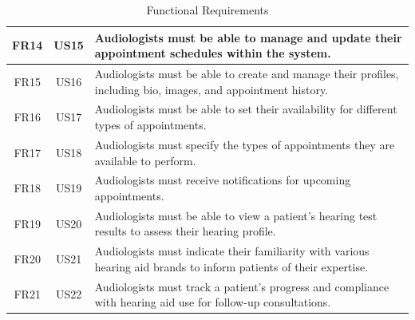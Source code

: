 \documentclass{article}
\begin{document}
\begin{table}[h]
\begin{tabularx}{\textwidth}{|c|c|X|}
        \hline
        FR14 & US15 & Audiologists must be able to manage and update their appointment schedules within the system. \\
        \hline
        FR15 & US16 & Audiologists must be able to create and manage their profiles, including bio, images, and appointment history. \\
        \hline
        FR16 & US17 & Audiologists must be able to set their availability for different types of appointments. \\
        \hline
        FR17 & US18 & Audiologists must specify the types of appointments they are available to perform. \\
        \hline
        FR18 & US19 & Audiologists must receive notifications for upcoming appointments. \\
        \hline
        FR19 & US20 & Audiologists must be able to view a patient's hearing test results to assess their hearing profile. \\
        \hline
        FR20 & US21 &  Audiologists must indicate their familiarity with various hearing aid brands to inform patients of their expertise.\\
        \hline
        FR21 & US22 & Audiologists must track a patient's progress and compliance with hearing aid use for follow-up consultations. \\
        \hline
    \end{tabularx}
    \caption{Functional Requirements}
\end{table}

\newpage
\end{document}
